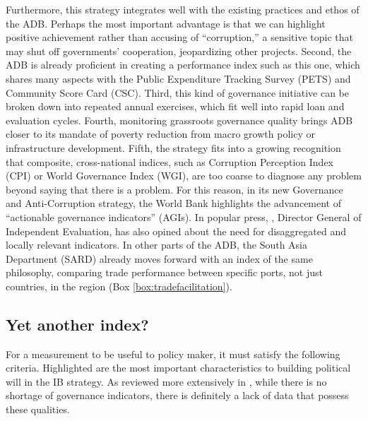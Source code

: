 \documentclass[12pt]{article}
\begin{document}
Furthermore, this strategy integrates well with the existing practices and ethos of the ADB. Perhaps the most important advantage is that we can highlight positive achievement rather than accusing of ``corruption,'' a sensitive topic that may shut off governments' cooperation, jeopardizing other projects. Second, the ADB is already proficient in creating a performance index such as this one, which shares many aspects with the Public Expenditure Tracking Survey (PETS) and Community Score Card (CSC). Third, this kind of governance initiative can be broken down into repeated annual exercises, which fit well into rapid loan and evaluation cycles. Fourth, monitoring grassroots governance quality brings ADB closer to its mandate of poverty reduction from macro growth policy or infrastructure development. Fifth, the strategy fits into a growing recognition that composite, cross-national indices, such as Corruption Perception Index (CPI) or World Governance Index (WGI), are too coarse to diagnose any problem beyond saying that there is a problem. For this reason, in its new Governance and Anti-Corruption strategy, the World Bank highlights the advancement of ``actionable governance indicators'' (AGIs). In popular press, \citet{Thomas2013}, Director General of Independent Evaluation, has also opined about the need for disaggregated and locally relevant indicators.  In other parts of the ADB, the South Asia Department (SARD) already moves forward with an index of the same philosophy, comparing trade performance between specific ports, not just countries, in the region (Box \ref{box:tradefacilitation}).

\subsection{Yet another index?} \label{sec:anotherindex}
For a measurement to be useful to policy maker, it must satisfy the following criteria. Highlighted are the most important characteristics to building political will in the IB strategy. As reviewed more extensively in \citet{Pande2013}, while there is no shortage of governance indicators, there is definitely a lack of data that possess these qualities.
\end{document}
